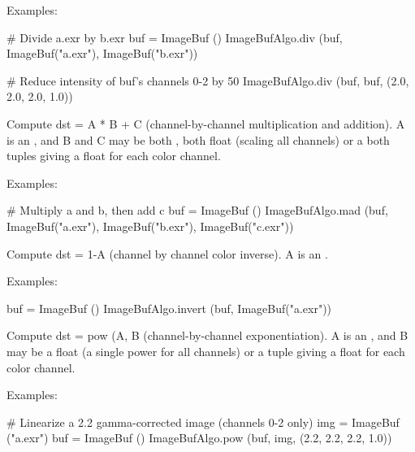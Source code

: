 \smallskip
\noindent Examples:
\begin{code}
    # Divide a.exr by b.exr
    buf = ImageBuf ()
    ImageBufAlgo.div (buf, ImageBuf("a.exr"), ImageBuf("b.exr"))

    # Reduce intensity of buf's channels 0-2 by 50%
    ImageBufAlgo.div (buf, buf, (2.0, 2.0, 2.0, 1.0))
\end{code}
\apiend


 

Compute {\cf dst} = {\cf A * B + C} (channel-by-channel multiplication
and addition). {\cf A}
is an \ImageBuf, and {\cf B} and {\cf C} may be both \ImageBuf, both
{\cf float} (scaling all channels) or a both tuples giving a {\cf float} for
each color channel.

\smallskip
\noindent Examples:
\begin{code}
    # Multiply a and b, then add c
    buf = ImageBuf ()
    ImageBufAlgo.mad (buf, ImageBuf("a.exr"),
                      ImageBuf("b.exr"), ImageBuf("c.exr"))
\end{code}
\apiend



 

Compute {\cf dst = 1-A} (channel by channel color inverse).
{\cf A} is an \ImageBuf.

\smallskip
\noindent Examples:
\begin{code}
    buf = ImageBuf ()
    ImageBufAlgo.invert (buf, ImageBuf("a.exr"))
\end{code}
\apiend


 

Compute {\cf dst} = {\cf pow (A, B} (channel-by-channel exponentiation).
{\cf A} is an \ImageBuf, and {\cf B} may be a {\cf float} (a single power
for all channels) or a tuple giving a {\cf float} for each color channel.

\smallskip
\noindent Examples:
\begin{code}
    # Linearize a 2.2 gamma-corrected image (channels 0-2 only)
    img = ImageBuf ("a.exr")
    buf = ImageBuf ()
    ImageBufAlgo.pow (buf, img, (2.2, 2.2, 2.2, 1.0))
\end{code}
\apiend


